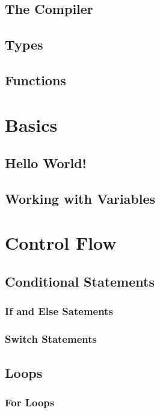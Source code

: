 \documentclass[11pt,fancy,authoryear]{elegantbook}
\begin{document}
\section{The Compiler}

\section{Types}

\section{Functions}

\chapter{Basics}

\section{Hello World!}

\section{Working with Variables}

\chapter{Control Flow}

\section{Conditional Statements}

\subsection{If and Else Satements}

\subsection{Switch Statements}

\section{Loops}

\subsection{For Loops}
\end{document}
